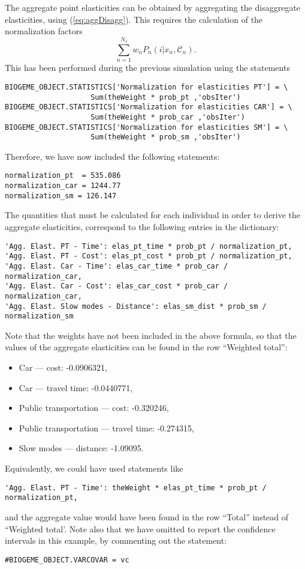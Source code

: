\documentclass[12pt,a4paper]{article}
\newcommand{\req}[1]{(\ref{#1})}
\newcommand{\C}{\mathcal{C}}
\begin{document}
The aggregate point elasticities can be obtained by aggregating the
disaggregate elasticities, using \req{eq:aggDisagg}. This requires the
calculation of the normalization factors
\begin{equation}
\sum_{n=1}^{N_s} w_n P_n(i|x_n, \C_n).
\end{equation}
This has been performed during the previous simulation using the
statements
\begin{lstlisting}
BIOGEME_OBJECT.STATISTICS['Normalization for elasticities PT'] = \
                    Sum(theWeight * prob_pt ,'obsIter')
BIOGEME_OBJECT.STATISTICS['Normalization for elasticities CAR'] = \
                    Sum(theWeight * prob_car ,'obsIter')
BIOGEME_OBJECT.STATISTICS['Normalization for elasticities SM'] = \
                    Sum(theWeight * prob_sm ,'obsIter')
\end{lstlisting}
Therefore, we have now included the following statements:
\begin{lstlisting}
normalization_pt  = 535.086
normalization_car = 1244.77
normalization_sm = 126.147
\end{lstlisting}
The quantities that must be calculated for each individual
in order to derive the aggregate elasticities, correspond to the
following entries in the dictionary:
\begin{lstlisting}
'Agg. Elast. PT - Time': elas_pt_time * prob_pt / normalization_pt,
'Agg. Elast. PT - Cost': elas_pt_cost * prob_pt / normalization_pt,
'Agg. Elast. Car - Time': elas_car_time * prob_car / normalization_car,
'Agg. Elast. Car - Cost': elas_car_cost * prob_car / normalization_car,
'Agg. Elast. Slow modes - Distance': elas_sm_dist * prob_sm / normalization_sm
\end{lstlisting}
Note that the weights have not been included in the above formula, so
that 
the values of the aggregate elasticities can be found in the row ``Weighted total'':
\begin{itemize}
\item Car --- cost: -0.0906321,
\item Car --- travel time: -0.0440771,
\item Public transportation --- cost: -0.320246,
\item Public transportation --- travel time: -0.274315,
\item Slow modes --- distance: -1.09095.
\end{itemize}
Equivalently, we could have used statements like
\begin{lstlisting}
'Agg. Elast. PT - Time': theWeight * elas_pt_time * prob_pt / normalization_pt,
\end{lstlisting}
and the aggregate value would have been found in the row ``Total''
instead of ``Weighted total'.
Note also that we have omitted to report the confidence intervals in this
example, by commenting out the statement:
\begin{lstlisting}
#BIOGEME_OBJECT.VARCOVAR = vc
\end{lstlisting}
\end{document}
